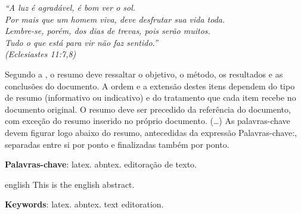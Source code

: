 \documentclass[
	12pt,				%
	openright,			%
	twoside,			%
	a4paper,			%
	english,			%
	french,				%
	spanish,			%
	brazil				%
	]{senai-cimatec-abntex2}
\begin{document}
\begin{epigrafe}
	\vspace*{\fill}
	\begin{flushright}
		\textit{``A luz é agradável, é bom ver o sol.\\
			Por mais que um homem viva, deve desfrutar sua vida toda.\\ Lembre-se, porém, dos dias de trevas, pois serão muitos. \\ Tudo o que está para vir não faz sentido.''\\
			(Eclesiastes 11:7,8)}
	\end{flushright}
\end{epigrafe}

\setlength{\absparsep}{18pt} %
\begin{resumo}
	Segundo a , o resumo deve ressaltar o
	objetivo, o método, os resultados e as conclusões do documento. A ordem e a extensão destes itens dependem do tipo de resumo (informativo ou indicativo) e do tratamento que cada item recebe no documento original. O resumo deve ser precedido da referência do documento, com exceção do resumo inserido no próprio documento. (\ldots) As palavras-chave devem figurar logo abaixo do resumo, antecedidas da expressão Palavras-chave:, separadas entre si por ponto e finalizadas também por ponto.

	\textbf{Palavras-chave}: latex. abntex. editoração de texto.
\end{resumo}

\begin{resumo}[Abstract]
	\begin{otherlanguage*}{english}
		This is the english abstract.

		\vspace{\onelineskip}

		\noindent
		\textbf{Keywords}: latex. abntex. text editoration.
	\end{otherlanguage*}
\end{resumo}


\end{document}
